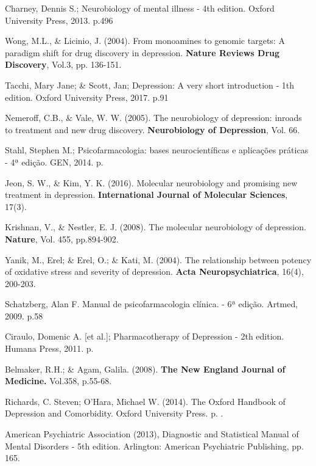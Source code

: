 \begin{thebibliography}{00}

     Charney, Dennis S.; Neurobiology of mental illness - 4th edition. Oxford University Press, 2013. p.496
    
     Wong, M.L., \& Licinio, J. (2004). From monoamines to genomic targets: A paradigm shift for drug discovery in depression. \textbf{Nature Reviews Drug Discovery}, Vol.3, pp. 136-151.
    
     Tacchi, Mary Jane; \& Scott, Jan; Depression: A very short introduction - 1th edition. Oxford University Press, 2017. p.91
    
     Nemeroff, C.B., \& Vale, W. W. (2005). The neurobiology of depression: inroads to treatment and new drug discovery. \textbf{Neurobiology of Depression}, Vol. 66.
    
    
     Stahl, Stephen M.; Psicofarmacologia: bases neurocientíficas e aplicações práticas - 4ª edição. GEN, 2014. p.
    
     Jeon, S. W., \& Kim, Y. K. (2016). Molecular neurobiology and promising new treatment in depression. \textbf{International Journal of Molecular Sciences}, 17(3).
    
     Krishnan, V., \& Nestler, E. J. (2008). The molecular neurobiology of depression. \textbf{Nature}, Vol. 455, pp.894-902.
    
     Yanik, M., Erel; \& Erel, O.; \& Kati, M. (2004). The relationship between potency of oxidative stress and severity of depression. \textbf{Acta Neuropsychiatrica}, 16(4), 200-203.
    
     Schatzberg, Alan F. Manual de psicofarmacologia clínica. - 6ª edição. Artmed, 2009. p.58
    
     Ciraulo, Domenic A. [et al.]; Pharmacotherapy of Depression - 2th edition. Humana Press, 2011. p.
    
     Belmaker, R.H.; \& Agam, Galila. (2008). \textbf{The New England Journal of Medicine.} Vol.358, p.55-68.   
    
     Richards, C. Steven; O'Hara, Michael W. (2014). The Oxford Handbook of Depression and Comorbidity. Oxford University Press. p. .
    
     American Psychiatric Association (2013), Diagnostic and Statistical Manual of Mental Disorders - 5th edition. Arlington: American Psychiatric Publishing, pp. 165.
    

\end{thebibliography}
